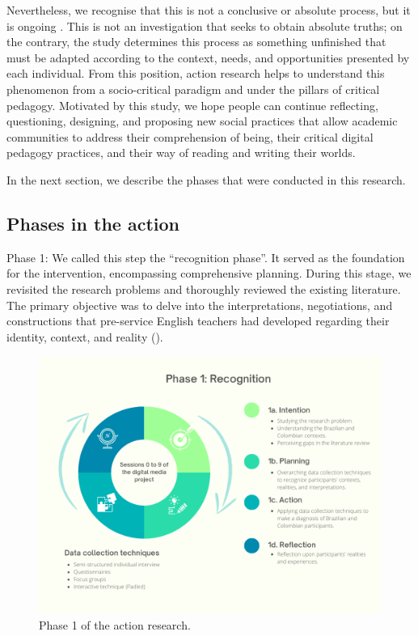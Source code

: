 \documentclass[english]{textolivre}
\begin{document}
Nevertheless, we recognise that this is not a conclusive or absolute process, but it is ongoing \cite{koshy2010}. This is not an investigation that seeks to obtain absolute truths; on the contrary, the study determines this process as something unfinished that must be adapted according to the context, needs, and opportunities presented by each individual. From this position, action research helps to understand this phenomenon from a socio-critical paradigm and under the pillars of critical pedagogy. Motivated by this study, we hope people can continue reflecting, questioning, designing, and proposing new social practices that allow academic communities to address their comprehension of being, their critical digital pedagogy practices, and their way of reading and writing their worlds.

In the next section, we describe the phases that were conducted in this research.


\subsection{Phases in the action}\label{sec-modelo}
Phase 1: We called this step the “recognition phase”. It served as the foundation for the intervention, encompassing comprehensive planning. During this stage, we revisited the research problems and thoroughly reviewed the existing literature. The primary objective was to delve into the interpretations, negotiations, and constructions that pre-service English teachers had developed regarding their identity, context, and reality ().

\begin{figure}[h!]
    \centering
    \includegraphics[width=0.8\linewidth]{Fig1.png}
    \caption{Phase 1 of the action research.}
    \label{fig1}
\end{figure}
\end{document}
